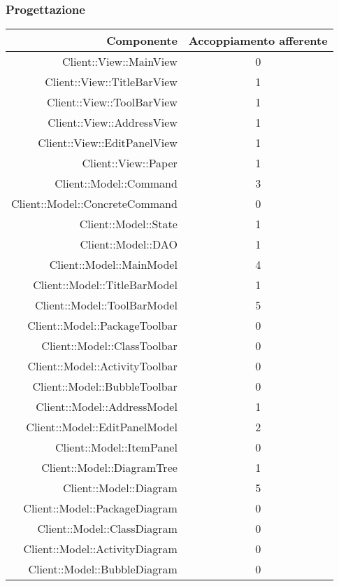 \documentclass[../PianoDiQualifica.tex]{subfiles}
\begin{document}
			\subsubsection{Progettazione}
			\begin{longtable}{|r|c|}
				\hline
				\rowcolor{blue!30}\textbf{Componente} & \textbf{Accoppiamento afferente} \\
				\hline
				\endhead
				Client::View::MainView &  0 \\ \hline
				Client::View::TitleBarView & 1 \\ \hline
				Client::View::ToolBarView & 1 \\ \hline
				Client::View::AddressView & 1 \\ \hline
				Client::View::EditPanelView & 1 \\ \hline
				Client::View::Paper & 1 \\ \hline
				Client::Model::Command & 3\\ \hline
				Client::Model::ConcreteCommand & 0 \\ \hline
				Client::Model::State & 1 \\ \hline
				Client::Model::DAO & 1 \\ \hline
				Client::Model::MainModel &4 \\ \hline
				Client::Model::TitleBarModel & 1 \\ \hline
				Client::Model::ToolBarModel & 5 \\ \hline
				Client::Model::PackageToolbar & 0 \\ \hline
				Client::Model::ClassToolbar & 0 \\ \hline
				Client::Model::ActivityToolbar & 0 \\ \hline
				Client::Model::BubbleToolbar & 0 \\ \hline
				Client::Model::AddressModel & 1 \\ \hline
				Client::Model::EditPanelModel & 2 \\ \hline
				Client::Model::ItemPanel & 0 \\ \hline
				Client::Model::DiagramTree & 1 \\ \hline
				Client::Model::Diagram & 5 \\ \hline
				Client::Model::PackageDiagram & 0 \\ \hline
				Client::Model::ClassDiagram & 0 \\ \hline
				Client::Model::ActivityDiagram & 0 \\ \hline
				Client::Model::BubbleDiagram & 0 \\ \hline

\end{longtable}
\end{document}

